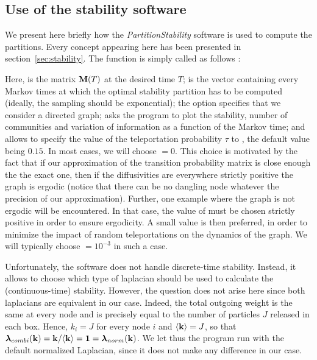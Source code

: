 \subsection{Use of the stability software}
We present here briefly how the \textit{PartitionStability} software is used to compute the partitions. Every concept appearing here has been presented in section~\ref{sec:stability}. The  function is simply called as follows : \vspace{-.2cm}
\begin{center}
\end{center} %
Here,  is the matrix $\mathbf M(T)$ at the desired time $T$;  is the vector containing every Markov times at which the optimal stability partition has to be computed (ideally, the sampling should be exponential); the  option specifies that we consider a directed graph;  asks the program to plot the stability, number of communities and variation of information as a function of the Markov time; and  allows to specify the value of the teleportation probability $\tau$ to , the default value being $0.15$. In most cases, we will choose  $= 0$. This choice is motivated by the fact that if our approximation of the transition probability matrix is close enough the the exact one, then if the diffusivities are everywhere strictly positive the graph is ergodic (notice that there can be no dangling node whatever the precision of our approximation). Further, one example where the graph is not ergodic will be encountered. In that case, the value of  must be chosen strictly positive in order to ensure ergodicity. A small value is then preferred, in order to minimize the impact of random teleportations on the dynamics of the graph. We will typically choose  $=10^{-3}$ in such a case.

Unfortunately, the software does not handle discrete-time stability. Instead, it allows to choose which type of laplacian should be used to calculate the (continuous-time) stability. However, the question does not arise here since both laplacians are equivalent in our case. Indeed, the total outgoing weight is the same at every node and is precisely equal to the number of particles $J$ released in each box. Hence, $k_i = J$ for every node $i$ and $\langle \mathbf k \rangle = J$, so that $\boldsymbol \lambda_{combi}(\mathbf k) = \mathbf k/ \langle \mathbf k \rangle = \mathbf 1 = \boldsymbol \lambda_{norm}(\mathbf k)$. We let thus the program run with the default normalized Laplacian, since it does not make any difference in our case.

